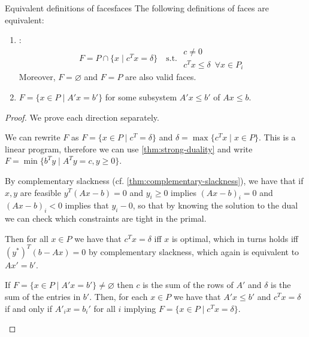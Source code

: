 \documentclass[12pt]{extarticle}
\begin{document}
\begin{lemma}{Equivalent definitions of faces}{faces}
	The following definitions of faces are equivalent:
	\begin{enumerate}
		\item {}:
		      \begin{equation}
			      F = P \cap \{ x \mid c^T x = \delta \} \quad \text{s.t. }
			      \substack{c \neq 0 \\ c^T x \leq \delta \enspace \forall x \in P_i}
		      \end{equation}
		      Moreover, $F = \varnothing$ and $F = P$ are also valid faces.
		\item $F = \{ x \in P \mid A'x = b'\}$ for some subsystem $A'x \leq b'$ of
		      $Ax \leq b$.
	\end{enumerate}
\end{lemma}

\begin{proof}
	We prove each direction separately.
	\begin{description}[font=\normalfont\itshape]
		\item[(1) $\implies$ (2)]
		      We can rewrite $F$ as $F = \{ x \in P \mid c^T = \delta\}$ and
		      $\delta = \max \{ c^T x \mid x \in P\}$.
		      This is a linear program, therefore we can use \cref{thm:strong-duality} and write
		      $F = \min \{b^T y \mid A^T y = c, y \geq 0 \}$.

		      By complementary slackness (cf. \cref{thm:complementary-slackness}),
		      we have that if $x, y$ are feasible $y^T(Ax - b) = 0$ and
		      $y_i \geq 0$ implies $(Ax - b)_i = 0$ and $(Ax - b)_i < 0$ implies that $y_i - 0$,
		      so that by knowing the solution to the dual we can check which constraints are tight
		      in the primal.

		      Then for all $x \in P$ we have that $c^T x = \delta$ iff $x$ is optimal, which in turns
		      holds iff $(y^*)^T(b - Ax) = 0$ by complementary slackness, which again is equivalent
		      to $Ax'= b'$.

		\item[(2) $\implies$ (1)]
		      If $F = \{ x \in P \mid A'x = b'\} \neq \varnothing$ then $c$ is the sum of the rows
		      of $A'$ and $\delta$ is the sum of the entries in $b'$.
		      Then, for each $x \in P$ we have that $A'x\leq b'$ and $c^T x = \delta$ if and only if
		      $A'_i x = b_i'$ for all $i$ implying $F = \{ x \in P \mid c^T x = \delta \}$.
		      \qedhere
	\end{description}
\end{proof}
\end{document}
